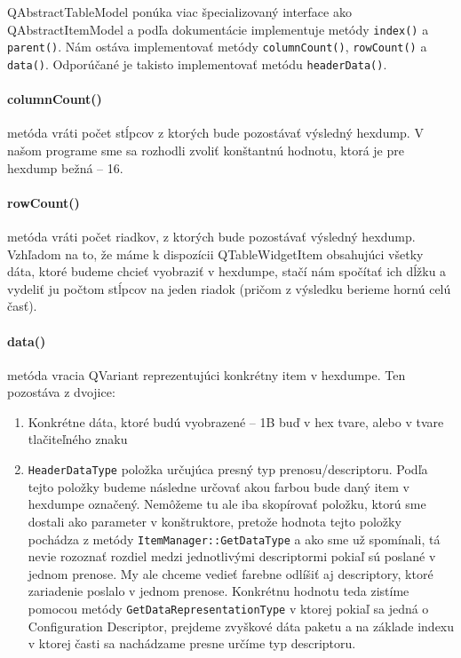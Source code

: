 QAbstractTableModel ponúka viac špecializovaný interface ako QAbstractItemModel a podľa dokumentácie implementuje metódy \texttt{index()} a \texttt{parent()}. Nám ostáva implementovať metódy \texttt{columnCount()}, \texttt{rowCount()} a \texttt{data()}. Odporúčané je takisto implementovať metódu \texttt{headerData()}.

\paragraph{columnCount()} metóda vráti počet stĺpcov z ktorých bude pozostávať výsledný hexdump. V našom programe sme sa rozhodli zvoliť konštantnú hodnotu, ktorá je pre hexdump bežná -- 16.

\paragraph{rowCount()} metóda vráti počet riadkov, z ktorých bude pozostávať výsledný hexdump. Vzhľadom na to, že máme k dispozícii QTableWidgetItem obsahujúci všetky dáta, ktoré budeme chcieť vyobraziť v hexdumpe, stačí nám spočítať ich dĺžku a vydeliť ju počtom stĺpcov na jeden riadok (pričom z výsledku berieme hornú celú časť).

\paragraph{data()} metóda vracia QVariant reprezentujúci konkrétny item v hexdumpe. Ten pozostáva z dvojice:
\begin{enumerate}
\item Konkrétne dáta, ktoré budú vyobrazené -- 1B buď v hex tvare, alebo v tvare tlačiteľného znaku
\item \texttt{HeaderDataType} položka určujúca presný typ prenosu/descriptoru. Podľa tejto položky budeme následne určovať akou farbou bude daný item v hexdumpe označený. Nemôžeme tu ale iba skopírovať položku, ktorú sme dostali ako parameter v konštruktore, pretože hodnota tejto položky pochádza z metódy \texttt{ItemManager::GetDataType} a ako sme už spomínali, tá nevie rozoznať rozdiel medzi jednotlivými descriptormi pokiaľ sú poslané v jednom prenose. My ale chceme vedieť farebne odlíšiť aj descriptory, ktoré zariadenie poslalo v jednom prenose. Konkrétnu hodnotu teda zistíme pomocou metódy \texttt{GetDataRepresentationType} v ktorej pokiaľ sa jedná o Configuration Descriptor, prejdeme zvyškové dáta paketu a na základe indexu v ktorej časti sa nachádzame presne určíme typ descriptoru.
\end{enumerate}

